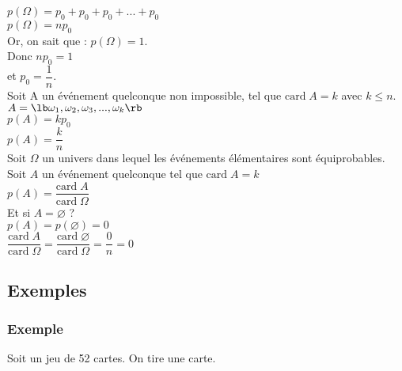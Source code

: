 $p\left(\Omega\right) = p_0 + p_0 + p_0 + ... + p_0 $ \\

$p\left(\Omega\right) = np_0$ \\

Or, on sait que : $p\left(\Omega\right) = 1$. \\

Donc $np_0 = 1 $ \\

et $ p_0 = \dfrac{1}{n} $. \\

Soit A un événement quelconque non impossible, tel que $\mathrm{card} \; A = k$ avec $k \leq n$. \\

$A = \lb \omega_1 , \omega_2 , \omega_3, ... , \omega_k \rb $ \\

$p\left(A\right) = kp_0$ \\

$ p\left(A\right) = \dfrac{k}{n} $ \\

Soit $\Omega$ un univers dans lequel les événements élémentaires sont équiprobables. Soit $A$ un événement quelconque tel que $\mathrm{card} \;  A = k$  \\

$ p\left(A\right) = \dfrac{\mathrm{card} \; A}{\mathrm{card} \; \Omega} $ \\

Et si $ A = \varnothing $ ? \\ 

$ p \left(A\right) = p \left(\varnothing\right) = 0 $ \\

$\dfrac{\mathrm{card} \; A}{\mathrm{card} \; \Omega} = \dfrac{\mathrm{card} \; \varnothing }{\mathrm{card} \; \Omega} = \dfrac{0}{n} = 0 $ \\

\newpage

\subsection{Exemples}

\subsubsection{Exemple }

Soit un jeu de 52 cartes. On tire une carte.

